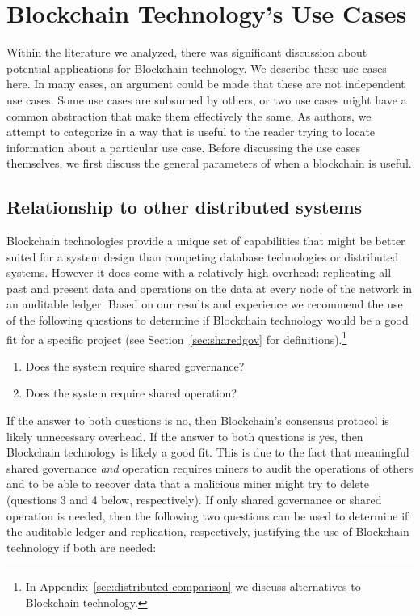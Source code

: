 
\section{Blockchain Technology's Use Cases}
\label{sec:use-cases}

Within the literature we analyzed, there was significant discussion about potential applications for Blockchain technology.
We describe these use cases here.
In many cases, an argument could be made that these are not independent use cases. Some use cases are subsumed by others, or two use cases might have a common abstraction that make them effectively the same.
As authors, we attempt to categorize in a way that is useful to the reader trying to locate information about a particular use case. Before discussing the use cases themselves, we first discuss the general parameters of when a blockchain is useful. 

\subsection{Relationship to other distributed systems}

Blockchain technologies provide a unique set of capabilities that might be better suited for a system design than competing database technologies or distributed systems.
However it does come with a relatively high overhead: replicating all past and present data and operations on the data at every node of the network in an auditable ledger.
Based on our results and experience we recommend the use of the following questions to determine if Blockchain technology would be a good fit for a specific project (see Section~\ref{sec:sharedgov} for definitions).\footnote{In Appendix~\ref{sec:distributed-comparison} we discuss alternatives to Blockchain technology.}

\begin{enumerate}
	\item Does the system require shared governance?
	\item Does the system require shared operation?
\end{enumerate}

If the answer to both questions is no, then Blockchain's consensus protocol is likely unnecessary overhead. If the answer to both questions is yes, then Blockchain technology is likely a good fit. This is due to the fact that meaningful shared governance \emph{and} operation requires miners to audit the operations of others and to be able to recover data that a malicious miner might try to delete (questions 3 and 4 below, respectively). If only shared governance or shared operation is needed, then the following two questions can be used to determine if the auditable ledger and replication, respectively, justifying the use of Blockchain technology if both are needed:

